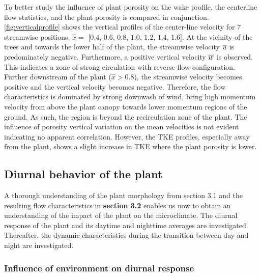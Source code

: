 To better study the influence of plant porosity on the wake profile, the centerline flow statistics, and the plant porosity is compared in conjunction. \cref{fig:verticalprofile} shows the vertical profiles of the center-line velocity for 7 streamwise positions, $\hat{x} =$ $[0.4$, $0.6$, $0.8$, $1.0$, $1.2$, $1.4$, $1.6]$. At the vicinity of the trees and towards the lower half of the plant, the streamwise velocity $\overline{u}$ is predominately negative. Furthermore, a positive vertical velocity $\overline{w}$ is observed. This indicates a zone of strong circulation with reverse-flow configuration. Further downstream of the plant ($\hat{x}>0.8$), the streamwise velocity becomes positive and the vertical velocity becomes negative. Therefore, the flow characteristics is dominated by strong downwash of wind, bring high momentum velocity from above the plant canopy towards lower momentum regions of the ground. As such, the region is beyond the recirculation zone of the plant. The influence of porosity vertical variation on the mean velocities is not evident indicating no apparent correlation. However, the TKE profiles, especially away from the plant, shows a slight increase in TKE where the plant porosity is lower.

\subsection{Diurnal behavior of the plant}
\label{subsec:diurnal}

A thorough understanding of the plant morphology from section 3.1 and the resulting flow characteristics in \textbf{section 3.2} enables us now to obtain an understanding of the impact of the plant on the microclimate. The diurnal response of the plant and its daytime and nighttime averages are investigated. Thereafter, the dynamic characteristics during the transition between day and night are investigated. 

\subsubsection*{Influence of environment on diurnal response}

